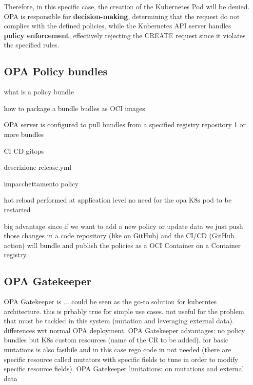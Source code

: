Therefore, in this specific case, the creation of the Kubernetes Pod will be denied. OPA is responsible for \textbf{decision-making}, determining that the request do not complies with the defined policies, while the Kubernetes API server handles \textbf{policy enforcement}, effectively rejecting the CREATE request since it violates the specified rules.


\subsection{OPA Policy bundles}

what is a policy bundle

how to package a bundle
budles as OCI images

OPA server is configured to pull bundles from a specified registry repository
1 or more bundles

CI CD
gitops



descrizione release.yml

impacchettamento policy






hot reload performed at application level 
no need for the opa K8s pod to be restarted

big advantage since if we want to add a new policy or update data we just push those changes in a code repository (like on GitHub) and the CI/CD (GitHub action) will bundle and publish the policies as a OCI Container on a Container registry. \newpage




\subsection{OPA Gatekeeper}

OPA Gatekeeper is ... could be seen as the go-to solution for kuberntes architecture.
this is prbably true for simple use cases. not useful for the problem that must be tackled in this system (mutation and leveraging external data). differences wrt normal OPA deployment. OPA Gatekeeper advantages: no policy bundles but K8s custom resources (name of the CR to be added). for basic mutations is also fasibile and in this case rego code in not needed (there are specific resource called mutators with specific fields to tune in order to modify specific resource fields). OPA Gatekeeper limitations: on mutations and external data





